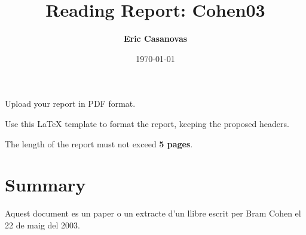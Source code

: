 \documentclass[a4paper, 10pt]{article}
\title{Reading Report: Cohen03}
\author{\textbf{Eric Casanovas}}
\date{\normalsize\today{}}
\begin{document}
\maketitle

\begin{center}
  Upload your report in PDF format.
  
  Use this LaTeX template to format the report, keeping the proposed headers.
  
	The length of the report must not exceed \textbf{5 pages}.
\end{center}

\section{Summary}

Aquest document es un paper o un extracte d'un llibre escrit per Bram Cohen el 22 de maig del 2003.
\end{document}
